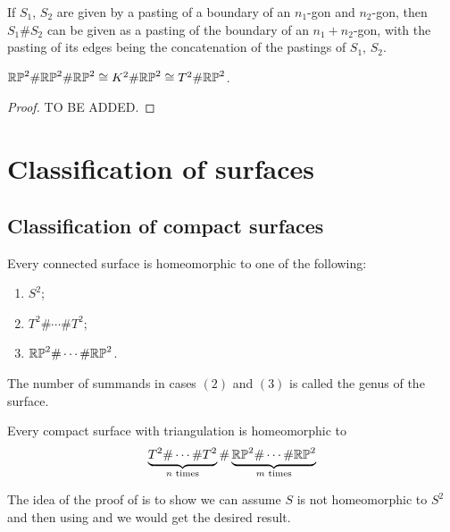 \documentclass[11pt,a4paper]{article}
\begin{document}
\begin{remark}
  If $S_1$, $S_2$ are given by a pasting of a boundary of an $n_1$-gon and
  $n_2$-gon, then $S_1 \# S_2$ can be given as a pasting of the boundary of
  an $n_1 + n_2$-gon, with the pasting of its edges being the concatenation
  of the pastings of $S_1$, $S_2$.
\end{remark}

\begin{proposition}
  \label{prop:pp-kp-tp}
  $\mathbb{RP}^2 \# \mathbb{RP}^2 \# \mathbb{RP}^2 \cong K^2 \# \mathbb{RP}^2 \cong T^2 \# \mathbb{RP}^2$.
\end{proposition}
\begin{proof}
  TO BE ADDED.
\end{proof}

\newpage

\section{Classification of surfaces}
\subsection{Classification of compact surfaces}

\begin{theorem}
  \label{thm:surfaces-classification}
  Every connected surface is homeomorphic to one of the following:
  \begin{enumerate}
    \item[(1)] $S^2$;
    \item[(2)] $T^2 \# \cdots \# T^2$;
    \item[(3)] $\mathbb{RP}^2 \# \cdots \# \mathbb{RP}^2$.
  \end{enumerate}
\end{theorem}
\begin{definition}[Genus]
  The number of summands in cases $(2)$ and $(3)$ is called the genus of
  the surface.
\end{definition}

\begin{theorem}
  \label{thm:classification-lemma}
  Every compact surface with triangulation is homeomorphic to
  \[
    \underbrace{T^2 \# \cdots \# T^2}_{n \text{ times}} \# 
    \underbrace{\mathbb{RP}^2 \# \cdots \# \mathbb{RP}^2}_{m \text{ times}}
  \]
\end{theorem}
The idea of the proof of  is to show
we can assume $S$ is not homeomorphic to $S^2$ and then using 
 and  we would get the
desired result.
\end{document}
